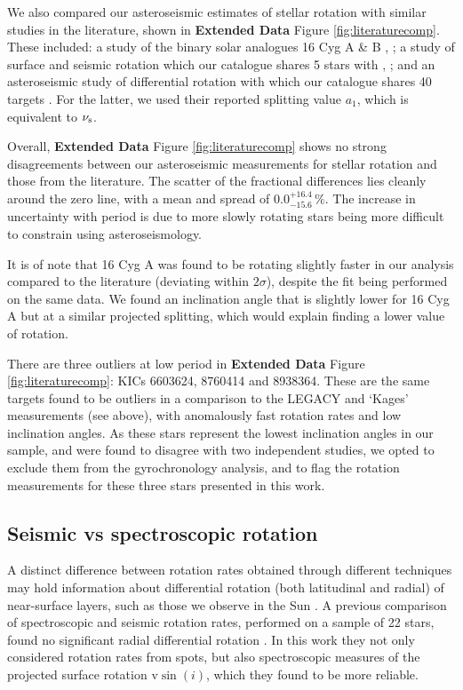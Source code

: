 We also compared our asteroseismic estimates of stellar rotation with similar studies in the literature, shown in \textbf{Extended Data} Figure \ref{fig:literaturecomp}. These included: a study of the binary solar analogues 16 Cyg A \& B \cite{m_davies+2015}, ; a study of surface and seismic rotation which our catalogue shares 5 stars with \cite{m_nielsen+2015}, ; and an asteroseismic study of differential rotation with which our catalogue shares 40 targets \cite{m_benomar+2018}. For the latter, we used their reported splitting value $a_1$, which is equivalent to $\nu_{\rm s}$. 

Overall,  \textbf{Extended Data} Figure \ref{fig:literaturecomp} shows no strong disagreements between our asteroseismic measurements for stellar rotation and those from the literature. The scatter of the fractional differences lies cleanly around the zero line, with a mean and spread of $0.0_{-15.6}^{+16.4}\, \%$. The increase in uncertainty with period is due to more slowly rotating stars being more difficult to constrain using asteroseismology.

It is of note that 16 Cyg A was found to be rotating slightly faster in our analysis compared to the literature \cite{m_davies+2015} (deviating within $2\sigma$), despite the fit being performed on the same data. We found an inclination angle that is slightly lower for 16 Cyg A but at a similar projected splitting, which would explain finding a lower value of rotation.

There are three outliers at low period in  \textbf{Extended Data} Figure \ref{fig:literaturecomp}: KICs 6603624, 8760414 and 8938364. These are the same targets found to be outliers in a comparison to the LEGACY and `Kages' measurements (see above), with anomalously fast rotation rates and low inclination angles. As these stars represent the lowest inclination angles in our sample, and were found to disagree with two independent studies, we opted to exclude them from the gyrochronology analysis, and to flag the rotation measurements for these three stars presented in this work.

\subsection{Seismic vs spectroscopic rotation}
A distinct difference between rotation rates obtained through different techniques may hold information about differential rotation (both latitudinal and radial) of near-surface layers, such as those we observe in the Sun \cite{m_beck2000}.  A previous comparison of spectroscopic and seismic rotation rates, performed on a sample of 22 stars, found no significant radial differential rotation \cite{m_benomar+2018}. In this work they not only considered rotation rates from spots, but also spectroscopic measures of the projected surface rotation $\textrm{v}\sin(i)$, which they found to be more reliable.

